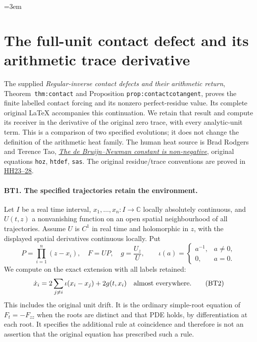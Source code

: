 \begingroup
\emergencystretch=3em
\section{The full-unit contact defect and its arithmetic trace derivative}
\label{sec:contact-trace-variation}

The supplied \emph{Regular-inverse contact defects and their arithmetic
return}, Theorem~\texttt{thm:contact} and Proposition
\texttt{prop:contactcotangent}, proves the finite labelled contact
forcing and its nonzero perfect-residue value. Its complete original
LaTeX accompanies this continuation. We retain that result and compute
its receiver in the derivative of the original zero trace, with every
analytic-unit term. This is a comparison of two specified evolutions;
it does not change the definition of the arithmetic heat family.
The human heat source is Brad Rodgers and Terence Tao,
\href{https://arxiv.org/abs/1801.05914v5}{\emph{The de Bruijn--Newman
constant is non-negative}}, original equations \texttt{hoz},
\texttt{htdef}, \texttt{sas}. The original residue/trace conventions
are proved in
\href{https://github.com/KokunoYumeto/zeta-function-research-reader/blob/3c022a0adde0a6aa3d8fc8e43ef42795d88e44b0/workbenches/splitzero-tandem/continuations/20260923-supported-zero-collision-holonomy/HEAT_COLLISION_HOLONOMY.tex}{HH23--28}.

\paragraph{BT1. The specified trajectories retain the environment.}
Let $I$ be a real time interval, $x_1,\ldots,x_n:I\to\mathbb C$
locally absolutely continuous, and $U(t,z)$ a nonvanishing function
on an open spatial neighbourhood of all trajectories. Assume $U$ is
$C^1$ in real time and holomorphic in $z$, with the displayed spatial
derivatives continuous locally. Put
\[
 P=\prod_{i=1}^n(z-x_i),\quad F=UP,\quad
 g=\frac{U_z}{U},\qquad
 \iota(a)=\begin{cases}a^{-1},&a\ne0,\\0,&a=0.\end{cases}
 \tag{BT1}
\]
We compute on the exact extension with all labels retained:
\[
 \dot x_i=2\sum_{j\ne i}\iota(x_i-x_j)+2g(t,x_i)
 \quad\hbox{almost everywhere.}
 \tag{BT2}
\]
This includes the original unit drift. It is the ordinary simple-root
equation of $F_t=-F_{zz}$ when the roots are distinct and that PDE
holds, by differentiation at each root. It specifies the additional
rule at coincidence and therefore is not an assertion that the
original equation has prescribed such a rule.

